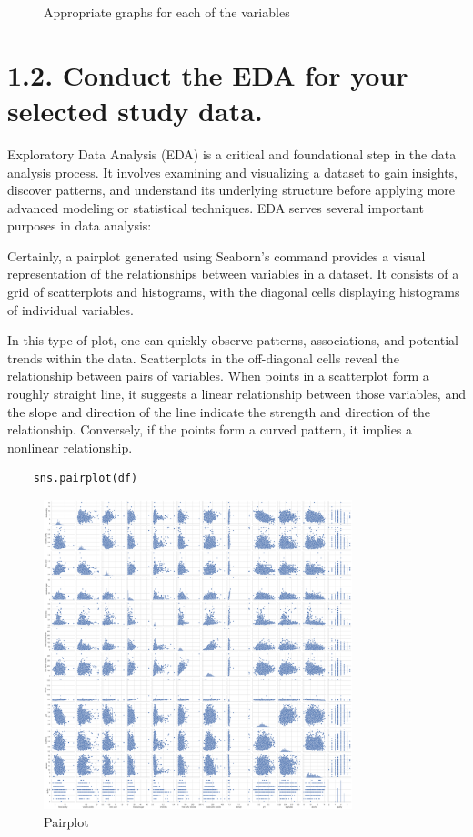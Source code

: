 \documentclass{report}
\begin{document}
\begin{figure}
    \caption{Appropriate graphs for each of the variables}
    \label{fig:fullfigure}
\end{figure}


\pagebreak

\section*{1.2. Conduct the EDA for your selected study data.}

Exploratory Data Analysis (EDA) is a critical and foundational step in the data analysis process. It involves examining and visualizing a dataset to gain insights, discover patterns, and understand its underlying structure before applying more advanced modeling or statistical techniques. EDA serves several important purposes in data analysis:

Certainly, a pairplot generated using Seaborn's  command provides a visual representation of the relationships between variables in a dataset. It consists of a grid of scatterplots and histograms, with the diagonal cells displaying histograms of individual variables.


In this type of plot, one can quickly observe patterns, associations, and potential trends within the data. Scatterplots in the off-diagonal cells reveal the relationship between pairs of variables. When points in a scatterplot form a roughly straight line, it suggests a linear relationship between those variables, and the slope and direction of the line indicate the strength and direction of the relationship. Conversely, if the points form a curved pattern, it implies a nonlinear relationship.

\begin{lstlisting}
    sns.pairplot(df)
\end{lstlisting}

\begin{figure}
    \centering
    \includegraphics[width=0.8\textwidth]{images/15.png}
    \caption{Pairplot}
    \label{fig:pairplot}
\end{figure}
\end{document}
